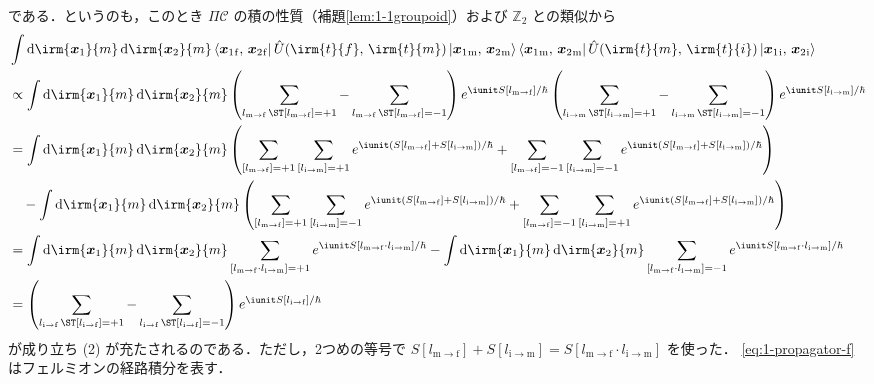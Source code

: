 \documentclass[TQFT_main]{subfiles}
\begin{document}
である．というのも，このとき $\Pi\mathcal{C}$ の積の性質（補題\ref{lem:1-1groupoid}）および $\mathbb{Z}_2$ との類似から
\begin{align}
    &\int \dd{\irm{\bm{x}_1}{m}}\dd{\irm{\bm{x}_2}{m}} \bra{\bm{x}_1{}_{\mathrm{f}},\, \bm{x}_2{}_{\mathrm{f}}} \hat{U}(\irm{t}{f},\, \irm{t}{m}) \ket{\bm{x}_1{}_{\mathrm{m}},\, \bm{x}_2{}_{\mathrm{m}}} \bra{\bm{x}_1{}_{\mathrm{m}},\, \bm{x}_2{}_{\mathrm{m}}} \hat{U}(\irm{t}{m},\, \irm{t}{i}) \ket{\bm{x}_1{}_{\mathrm{i}},\, \bm{x}_2{}_{\mathrm{i}}} \\
    &\propto \int \dd{\irm{\bm{x}_1}{m}}\dd{\irm{\bm{x}_2}{m}} \left( \sum_{l_{\mathrm{m} \to \mathrm{f}}\, \ST [l_{\mathrm{m} \to \mathrm{f}}] = +1} - \sum_{l_{\mathrm{m} \to \mathrm{f}}\, \ST [l_{\mathrm{m} \to \mathrm{f}}] = -1} \right) e^{\iunit S[l_{\mathrm{m} \to \mathrm{f}}]/\hbar} \left( \sum_{l_{\mathrm{i} \to \mathrm{m}}\, \ST [l_{\mathrm{i} \to \mathrm{m}}] = +1} - \sum_{l_{\mathrm{i} \to \mathrm{m}}\, \ST [l_{\mathrm{i} \to \mathrm{m}}] = -1} \right) e^{\iunit S[l_{\mathrm{i} \to \mathrm{m}}]/\hbar} \\
    &= 
    \int \dd{\irm{\bm{x}_1}{m}}\dd{\irm{\bm{x}_2}{m}} \left( \sum_{[l_{\mathrm{m} \to \mathrm{f}}] = +1} \sum_{[l_{\mathrm{i} \to \mathrm{m}}] = +1} e^{\iunit (S[l_{\mathrm{m} \to \mathrm{f}}] + S[l_{\mathrm{i} \to \mathrm{m}}]) / \hbar} + \sum_{[l_{\mathrm{m} \to \mathrm{f}}] = -1} \sum_{[l_{\mathrm{i} \to \mathrm{m}}] = -1} e^{\iunit (S[l_{\mathrm{m} \to \mathrm{f}}] + S[l_{\mathrm{i} \to \mathrm{m}}])/\hbar}\right)  \\
    &\quad -\int \dd{\irm{\bm{x}_1}{m}}\dd{\irm{\bm{x}_2}{m}} \left( \sum_{[l_{\mathrm{m} \to \mathrm{f}}] = +1} \sum_{[l_{\mathrm{i} \to \mathrm{m}}] = -1} e^{\iunit (S[l_{\mathrm{m} \to \mathrm{f}}] + S[l_{\mathrm{i} \to \mathrm{m}}]) / \hbar} + \sum_{[l_{\mathrm{m} \to \mathrm{f}}] = -1} \sum_{[l_{\mathrm{i} \to \mathrm{m}}] = +1} e^{\iunit (S[l_{\mathrm{m} \to \mathrm{f}}] + S[l_{\mathrm{i} \to \mathrm{m}}])/\hbar}\right)  \\
    &=
    \int \dd{\irm{\bm{x}_1}{m}}\dd{\irm{\bm{x}_2}{m}} \sum_{[l_{\mathrm{m} \to \mathrm{f}} \cdot l_{\mathrm{i} \to \mathrm{m}}] = +1} e^{\iunit S[l_{\mathrm{m} \to \mathrm{f}} \cdot l_{\mathrm{i} \to \mathrm{m}}]/\hbar}
    -\int \dd{\irm{\bm{x}_1}{m}}\dd{\irm{\bm{x}_2}{m}} \sum_{[l_{\mathrm{m} \to \mathrm{f}} \cdot l_{\mathrm{i} \to \mathrm{m}}] = -1}e^{\iunit S[l_{\mathrm{m} \to \mathrm{f}} \cdot l_{\mathrm{i} \to \mathrm{m}}] / \hbar} \\
    &= \left( \sum_{l_{\mathrm{i} \to \mathrm{f}}\, \ST [l_{\mathrm{i} \to \mathrm{f}}] = +1} - \sum_{l_{\mathrm{i} \to \mathrm{f}}\, \ST [l_{\mathrm{i} \to \mathrm{f}}] = -1} \right) e^{\iunit S[l_{\mathrm{i} \to \mathrm{f}}]/\hbar}
\end{align}
が成り立ち (2) が充たされるのである．ただし，2つめの等号で $S[l_{\mathrm{m} \to \mathrm{f}}] + S[l_{\mathrm{i} \to \mathrm{m}}] = S[l_{\mathrm{m} \to \mathrm{f}} \cdot l_{\mathrm{i} \to \mathrm{m}}]$ を使った．
\eqref{eq:1-propagator-f}はフェルミオンの経路積分を表す．
\end{document}
